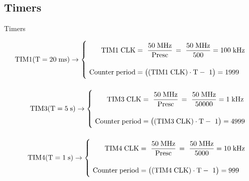\documentclass[aspectratio=169]{beamer}
\begin{document}
\subsection{Timers}
\begin{frame}{Timers}

\vspace{-0.7 cm}

\begin{align*}

        \mathrm{TIM1} (\mathrm{T} = 20\;\mathrm{ms)} \rightarrow \left\{ \begin{aligned}
	        \mathrm{TIM1 \; CLK} &= \,\, \dfrac{50\;\mathrm{MHz}}{\mathrm{Presc}} \, = \,\, \dfrac{50\;\mathrm{MHz}}{500} = 100\;\mathrm{kHz}\\[\bigskipamount]
	        \,\, \mathrm{Counter \; period} &= \left( \left( \mathrm{TIM1 \; CLK}\right) \cdot \mathrm{T} -\,\,1 \right) = 1999\\
        \end{aligned} \right. \\[\bigskipamount]

        \hspace{0.35cm} \mathrm{TIM3} (\mathrm{T} = 5\;\mathrm{s)} \rightarrow \left\{ \begin{aligned}
	        \mathrm{TIM3 \; CLK} &= \,\, \dfrac{50\;\mathrm{MHz}}{\mathrm{Presc}} \, = \,\, \dfrac{50\;\mathrm{MHz}}{50000} = 1\;\mathrm{kHz}\\[\bigskipamount]
	        \,\, \mathrm{Counter \; period} &= \left( \left( \mathrm{TIM3 \; CLK} \right) \cdot \mathrm{T} -\,\,1 \right) = 4999\\
        \end{aligned} \right. \\[\bigskipamount]
  
        \hspace{0.35cm} \mathrm{TIM4} (\mathrm{T} = 1\;\mathrm{s)} \rightarrow \left\{ \begin{aligned}
	        \mathrm{TIM4 \; CLK} &= \,\, \dfrac{50\;\mathrm{MHz}}{\mathrm{Presc}} \, = \,\, \dfrac{50\;\mathrm{MHz}}{5000} = 10\;\mathrm{kHz}\\[\bigskipamount]
	        \,\, \mathrm{Counter \; period} &= \left( \left( \mathrm{TIM4 \; CLK} \right) \cdot \mathrm{T} -\,\,1 \right) = 999\\
        \end{aligned} \right. \\[\bigskipamount]
    
\end{align*} 
\end{frame}
\end{document}
